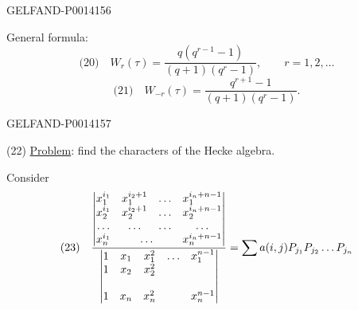 \begin{GelfandAdjacentEvidence}{GELFAND-P001415}{6}


General formula:
\[
\text{(20)}\quad W_r(\tau)=\frac{q(q^{r-1}-1)}{(q+1)(q^r-1)},\qquad r=1,2,\ldots
\]
\[
\text{(21)}\quad W_{-r}(\tau)=\frac{q^{r+1}-1}{(q+1)(q^r-1)}.
\]
\end{GelfandAdjacentEvidence}
\begin{GelfandAdjacentEvidence}{GELFAND-P001415}{7}


(22) \uline{Problem}: find the characters of the Hecke algebra.

Consider
\[
\text{(23)}\quad
\frac{
 \begin{vmatrix}
 x_1^{i_1}&x_1^{i_2+1}&\ldots&x_1^{i_n+n-1}\\
 x_2^{i_1}&x_2^{i_2+1}&\ldots&x_2^{i_n+n-1}\\
 \ldots&\ldots&\ldots&\ldots\\
 x_n^{i_1}&\multicolumn{2}{c}{\ldots}&x_n^{i_n+n-1}
 \end{vmatrix}
}{
 \begin{vmatrix}
 1&x_1&x_1^2&\ldots&x_1^{n-1}\\
 1&x_2&x_2^2&&\\
 &&&&\\
 1&x_n&x_n^2&&x_n^{n-1}
 \end{vmatrix}
}
=\sum a(i,j)P_{j_1}P_{j_2}\ldots P_{j_n}
\]
\end{GelfandAdjacentEvidence}



